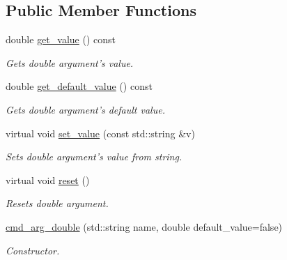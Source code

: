 \subsection*{Public Member Functions}
\begin{DoxyCompactItemize}
\item 
\hypertarget{classcmd__arg__double_a2b8fcb6d9d4a6f70cfdaf9856df0c2cf}{double \hyperlink{classcmd__arg__double_a2b8fcb6d9d4a6f70cfdaf9856df0c2cf}{get\-\_\-value} () const }\label{classcmd__arg__double_a2b8fcb6d9d4a6f70cfdaf9856df0c2cf}

\begin{DoxyCompactList}\small\item\em Gets double argument's value. \end{DoxyCompactList}\item 
\hypertarget{classcmd__arg__double_a7d419b419af85dfe19e4082b2696eec3}{double \hyperlink{classcmd__arg__double_a7d419b419af85dfe19e4082b2696eec3}{get\-\_\-default\-\_\-value} () const }\label{classcmd__arg__double_a7d419b419af85dfe19e4082b2696eec3}

\begin{DoxyCompactList}\small\item\em Gets double argument's default value. \end{DoxyCompactList}\item 
\hypertarget{classcmd__arg__double_a4b7dc6e7a0520080f456896635eaaa1a}{virtual void \hyperlink{classcmd__arg__double_a4b7dc6e7a0520080f456896635eaaa1a}{set\-\_\-value} (const std\-::string \&v)}\label{classcmd__arg__double_a4b7dc6e7a0520080f456896635eaaa1a}

\begin{DoxyCompactList}\small\item\em Sets double argument's value from string. \end{DoxyCompactList}\item 
\hypertarget{classcmd__arg__double_acdee4ee56f59219be6d8778dd6e84633}{virtual void \hyperlink{classcmd__arg__double_acdee4ee56f59219be6d8778dd6e84633}{reset} ()}\label{classcmd__arg__double_acdee4ee56f59219be6d8778dd6e84633}

\begin{DoxyCompactList}\small\item\em Resets double argument. \end{DoxyCompactList}\item 
\hyperlink{classcmd__arg__double_a41baf85e356cf8807fb1c3011b1f865a}{cmd\-\_\-arg\-\_\-double} (std\-::string name, double default\-\_\-value=false)
\begin{DoxyCompactList}\small\item\em Constructor. \end{DoxyCompactList}\end{DoxyCompactItemize}



